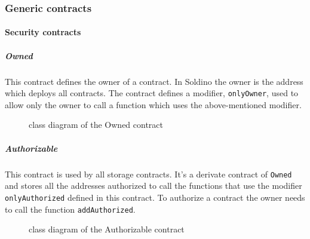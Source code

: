 \subsubsection{Generic contracts}
\paragraph{Security contracts}
\subparagraph{Owned}
This contract defines the owner of a contract. In Soldino the owner is the address which deploys all contracts. The contract defines a modifier, \texttt{onlyOwner}, used to allow only the owner to call a function which uses 
the above-mentioned modifier.
\begin{figure}[H]
	\centering
	\caption{class diagram of the Owned contract}
\end{figure}

\subparagraph{Authorizable}
This contract is used by all storage contracts. It's a derivate contract of \texttt{Owned} and stores 
all the addresses authorized to call the functions that use the modifier \texttt{onlyAuthorized} defined in this contract.
To authorize a contract the owner needs to call the function \texttt{addAuthorized}.
\begin{figure}[H]
	\centering
	\caption{class diagram of the Authorizable contract}
\end{figure}
\pagebreak
